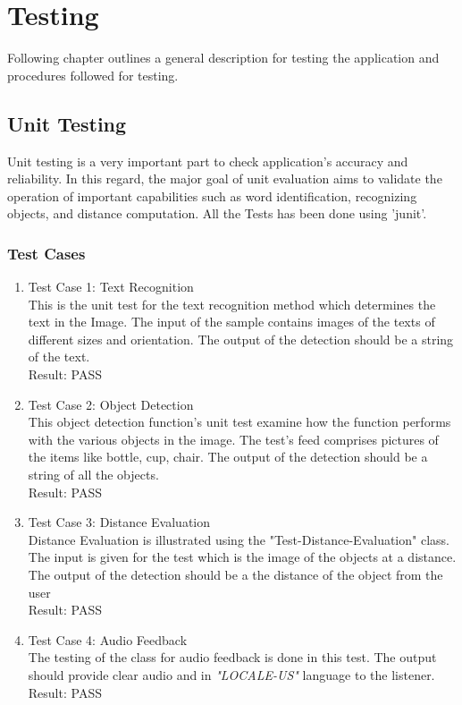 \documentclass[MScCS]{uccthesis}
\begin{document}
\chapter{Testing}
Following chapter outlines a general description for testing the application and procedures followed for testing.

\section{Unit Testing}
Unit testing is a very important part to check application's accuracy and reliability. In this regard, the major goal of unit evaluation aims to validate the operation of important capabilities such as word identification, recognizing objects, and distance computation.
All the Tests has been done using 'junit'.

\subsection{Test Cases}

\begin{enumerate}
    \item Test Case 1: Text Recognition
    \\This is the unit test for the text recognition method which determines the text in the Image.
    The input of the sample contains images of the texts of different sizes and orientation. The output of the detection should be a string of the text. 
    \\Result: PASS
    \item Test Case 2: Object Detection
    \\This object detection function's unit test examine how the function performs with the various objects in the image.
    The test's feed comprises pictures of the items like bottle, cup, chair. The output of the detection should be a string of all the objects. 
    \\Result: PASS
    \item Test Case 3: Distance Evaluation
    \\Distance Evaluation is illustrated using the "Test-Distance-Evaluation" class.
    The input is given for the test which is the image of the objects at a distance. The output of the detection should be a the distance of the object from the user 
    \\Result: PASS
    \item Test Case 4: Audio Feedback
    \\The testing of the class for audio feedback is done in this test. The output should provide clear audio and in \textit{"LOCALE-US"} language to the listener.
    \\Result: PASS
\end{enumerate}
\end{document}
